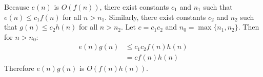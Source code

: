 \documentclass[12pt]{extarticle}
\begin{document}



Because $e(n)$ is $O(f(n))$, there exist constants $c_1$ and $n_1$ such that $e(n) \le c_1 f(n)$ for all $n > n_1$.
Similarly, there exist constants $c_2$ and $n_2$ such that $g(n) \le c_2 h(n)$ for all $n > n_2$.
Let $c = c_1 c_2$ and $n_0 = \max\{n_1, n_2\}$.
Then for $n > n_0$:
\begin{align*}
e(n)g(n) & \le c_1 c_2 f(n) h(n) \\
& = c f(n) h(n)
\end{align*}
Therefore $e(n)g(n)$ is $O(f(n)h(n))$.


\end{document}
